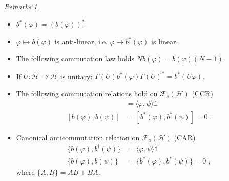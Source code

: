 \documentclass[
a4paper, %
11pt, %
onecolumn, %
openany, %
]{memoir}
\theoremstyle{definition}
\theoremstyle{remark}
\newtheorem{remarks}[definition]{Remarks}
\theoremstyle{plain}
\begin{document}
\begin{remarks}
	\begin{itemize}
		\item $b^*(\varphi)=(b(\varphi))^*$.
		\item $\varphi\mapsto b(\varphi)$ is anti-linear, i.e. $\varphi\mapsto b^*(\varphi)$ is linear.
		\item The following commutation law holds $Nb(\varphi)=b(\varphi)(N-1)$. 
		\item If $U:\mathcal{H}\rightarrow\mathcal{H}$ is unitary: $\Gamma(U)b^*(\varphi)\Gamma(U)^*=b^*(U\varphi)$.
		\item The following commutation relations hold on $\mathcal{F}_s(\mathcal{H})$ (CCR) \begin{align}
		[b(\varphi),b^*(\psi)]&=\langle\varphi,\psi\rangle\mathds{1}\\
		[b(\varphi),b(\psi)]&=[b^*(\varphi),b^*(\psi)]=0\; .
		\end{align}
		\item Canonical anticommutation relation on $\mathcal{F}_a(\mathcal{H})$ (CAR)\begin{align}
		\{b(\varphi),b^{\dagger}(\psi)\}&=\langle\varphi,\psi\rangle \mathds{1}\\
		\{b(\varphi),b(\psi)\}&=\{b^*(\varphi),b^*(\psi)\}=0\; ,
		\end{align}
		where $\{A,B\}=AB+BA$.
	\end{itemize}
\end{remarks}
\end{document}
